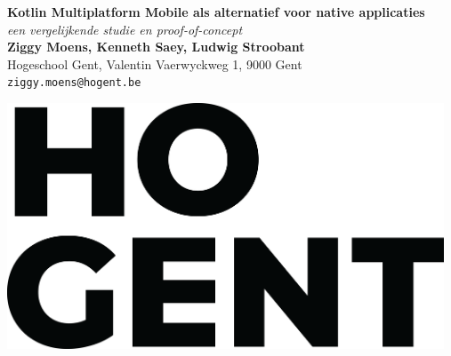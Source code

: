 \documentclass[a0,portrait]{a0poster}
\begin{document}


\begin{minipage}[t]{0.75\linewidth}
\VeryHuge \color{HoGentAccent1} \textbf{Kotlin Multiplatform Mobile als alternatief voor native applicaties} \color{Black}\\ %
\Huge\textit{een vergelijkende studie en proof-of-concept}\\[2.4cm] %
\huge \textbf{Ziggy Moens, Kenneth Saey, Ludwig Stroobant}\\[0.5cm] %
\huge Hogeschool Gent, Valentin Vaerwyckweg 1, 9000 Gent\\[0.4cm] %
\Large \texttt{ziggy.moens@hogent.be} \\
\end{minipage}
%
\begin{minipage}[t]{0.25\linewidth}
\includegraphics[width=13cm,right]{figures/HOGENT_Logo_Pos_rgb.png} 

\end{minipage}

\vspace{1cm} %

\end{document}
